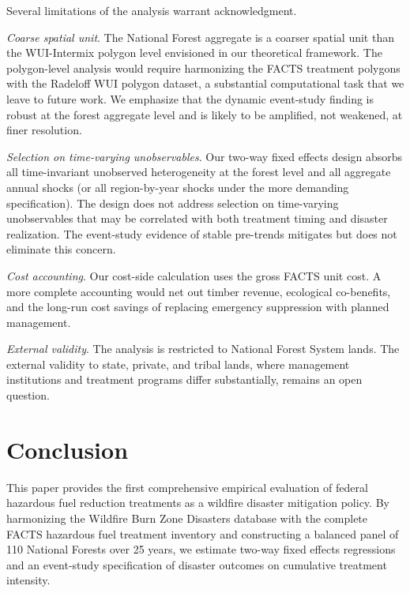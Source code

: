 \documentclass[12pt, letterpaper]{article}
\begin{document}
Several limitations of the analysis warrant acknowledgment.

\textit{Coarse spatial unit}. The National Forest aggregate is a coarser spatial unit than the WUI-Intermix polygon level envisioned in our theoretical framework. The polygon-level analysis would require harmonizing the FACTS treatment polygons with the Radeloff WUI polygon dataset, a substantial computational task that we leave to future work. We emphasize that the dynamic event-study finding is robust at the forest aggregate level and is likely to be amplified, not weakened, at finer resolution.

\textit{Selection on time-varying unobservables}. Our two-way fixed effects design absorbs all time-invariant unobserved heterogeneity at the forest level and all aggregate annual shocks (or all region-by-year shocks under the more demanding specification). The design does not address selection on time-varying unobservables that may be correlated with both treatment timing and disaster realization. The event-study evidence of stable pre-trends mitigates but does not eliminate this concern.

\textit{Cost accounting}. Our cost-side calculation uses the gross FACTS unit cost. A more complete accounting would net out timber revenue, ecological co-benefits, and the long-run cost savings of replacing emergency suppression with planned management.

\textit{External validity}. The analysis is restricted to National Forest System lands. The external validity to state, private, and tribal lands, where management institutions and treatment programs differ substantially, remains an open question.


\section{Conclusion}\label{sec:conclusion}

This paper provides the first comprehensive empirical evaluation of federal hazardous fuel reduction treatments as a wildfire disaster mitigation policy. By harmonizing the Wildfire Burn Zone Disasters database with the complete FACTS hazardous fuel treatment inventory and constructing a balanced panel of 110 National Forests over 25 years, we estimate two-way fixed effects regressions and an event-study specification of disaster outcomes on cumulative treatment intensity.
\end{document}

